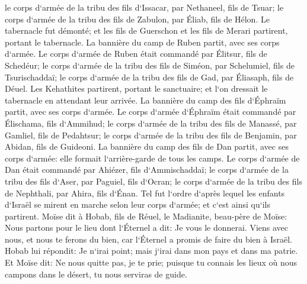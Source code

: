 \verse le corps d`armée de la tribu des fils d`Issacar, par Nethaneel, fils de Tsuar; 
\verse le corps d`armée de la tribu des fils de Zabulon, par Éliab, fils de Hélon. 
\verse Le tabernacle fut démonté; et les fils de Guerschon et les fils de Merari partirent, portant le tabernacle. 
\verse La bannière du camp de Ruben partit, avec ses corps d`armée. Le corps d`armée de Ruben était commandé par Élitsur, fils de Schedéur; 
\verse le corps d`armée de la tribu des fils de Siméon, par Schelumiel, fils de Tsurischaddaï; 
\verse le corps d`armée de la tribu des fils de Gad, par Éliasaph, fils de Déuel. 
\verse Les Kehathites partirent, portant le sanctuaire; et l`on dressait le tabernacle en attendant leur arrivée. 
\verse La bannière du camp des fils d`Éphraïm partit, avec ses corps d`armée. Le corps d`armée d`Éphraïm était commandé par Élischama, fils d`Ammihud; 
\verse le corps d`armée de la tribu des fils de Manassé, par Gamliel, fils de Pedahtsur; 
\verse le corps d`armée de la tribu des fils de Benjamin, par Abidan, fils de Guideoni. 
\verse La bannière du camp des fils de Dan partit, avec ses corps d`armée: elle formait l`arrière-garde de tous les camps. Le corps d`armée de Dan était commandé par Ahiézer, fils d`Ammischaddaï; 
\verse le corps d`armée de la tribu des fils d`Aser, par Paguiel, fils d`Ocran; 
\verse le corps d`armée de la tribu des fils de Nephthali, par Ahira, fils d`Énan. 
\verse Tel fut l`ordre d`après lequel les enfants d`Israël se mirent en marche selon leur corps d`armée; et c`est ainsi qu`ils partirent. 
\verse Moïse dit à Hobab, fils de Réuel, le Madianite, beau-père de Moïse: Nous partons pour le lieu dont l`Éternel a dit: Je vous le donnerai. Viens avec nous, et nous te ferons du bien, car l`Éternel a promis de faire du bien à Israël. 
\verse Hobab lui répondit: Je n`irai point; mais j`irai dans mon pays et dans ma patrie. 
\verse Et Moïse dit: Ne nous quitte pas, je te prie; puisque tu connais les lieux où nous campons dans le désert, tu nous serviras de guide. 
